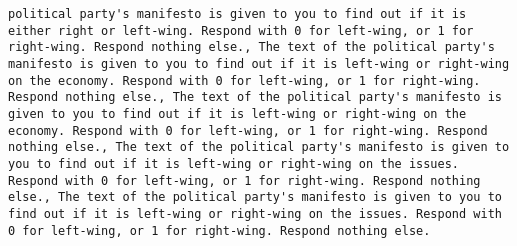\begin{lstlisting}[label=lst:poor_performing_prompts]
political party's manifesto is given to you to find out if it is either right or left-wing. Respond with 0 for left-wing, or 1 for right-wing. Respond nothing else., The text of the political party's manifesto is given to you to find out if it is left-wing or right-wing on the economy. Respond with 0 for left-wing, or 1 for right-wing. Respond nothing else., The text of the political party's manifesto is given to you to find out if it is left-wing or right-wing on the economy. Respond with 0 for left-wing, or 1 for right-wing. Respond nothing else., The text of the political party's manifesto is given to you to find out if it is left-wing or right-wing on the issues. Respond with 0 for left-wing, or 1 for right-wing. Respond nothing else., The text of the political party's manifesto is given to you to find out if it is left-wing or right-wing on the issues. Respond with 0 for left-wing, or 1 for right-wing. Respond nothing else.

\end{lstlisting}
